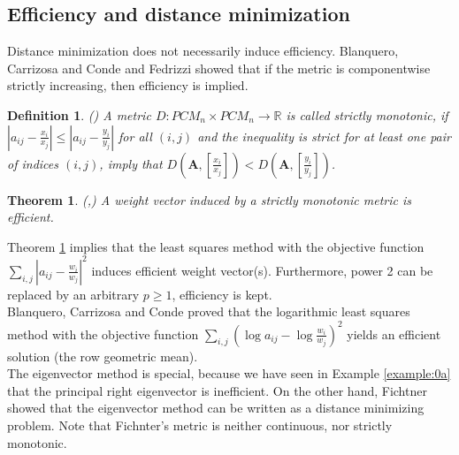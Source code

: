 \documentclass{article}
\theoremstyle{plain}
\newtheorem{definition}{Definition}[section]
\newtheorem{theorem}{Theorem}[section]
\begin{document}
\newpage
\subsection{Ef{\kern0pt}f{\kern0pt}iciency and distance minimization}

Distance minimization does not necessarily induce ef{\kern0pt}f{\kern0pt}iciency.
Blanquero, Carrizosa and Conde \cite{BlanqueroCarrizosaConde2006}
and Fedrizzi \cite{Fedrizzi2013} showed that if the metric is
componentwise strictly increasing, then ef{\kern0pt}f{\kern0pt}iciency is implied.
\begin{definition} (\cite{Fedrizzi2013})
A metric $D: PCM_n \times PCM_n \rightarrow \mathbb{R}$ is called strictly monotonic, if
$\left| a_{ij} - \frac{x_i}{x_j} \right| \leq \left| a_{ij} - \frac{y_i}{y_j} \right|$
for all $(i,j)$ and the inequality is strict for at least one pair of indices $(i,j)$, imply that
$ D(\mathbf{A}, \left[ \frac{x_i}{x_j} \right]) < D(\mathbf{A}, \left[ \frac{y_i}{y_j} \right])$.
\end{definition}
\begin{theorem} \label{thm:StrictlyMonotonicDistance} (\cite[Section 2]{BlanqueroCarrizosaConde2006},\cite{Fedrizzi2013})
A weight vector induced by a strictly monotonic metric is ef{\kern0pt}f{\kern0pt}icient.
\end{theorem}
Theorem \ref{thm:StrictlyMonotonicDistance}
implies that the least squares method \cite{ChuKalabaSpingarn1979} with the objective function
$\sum\limits_{i,j} \left| a_{ij} - \frac{w_i}{w_j} \right|^2$ induces ef{\kern0pt}f{\kern0pt}icient weight vector(s).
Furthermore, power 2 can be replaced by an arbitrary $p \geq 1$, ef{\kern0pt}f{\kern0pt}iciency is kept.\\


Blanquero, Carrizosa and Conde \cite[Corollary 7]{BlanqueroCarrizosaConde2006} proved that the
logarithmic least squares method \cite{CrawfordWilliams1980,CrawfordWilliams1985,De Graan1980}
with the objective function $\sum\limits_{i,j} \left( \log a_{ij} - \log \frac{w_i}{w_j} \right)^2$
yields an ef{\kern0pt}f{\kern0pt}icient solution (the row geometric mean).\\


The eigenvector method \cite{Saaty1977} is special, because we have seen in Example \ref{example:0a}
that the principal right eigenvector is inef{\kern0pt}f{\kern0pt}icient. On the other hand, Fichtner
\cite{Fichtner1984,Fichtner1986} showed that the eigenvector method can be written
as a distance minimizing problem. Note that Fichnter's metric is neither continuous, nor strictly monotonic.\\
\end{document}
